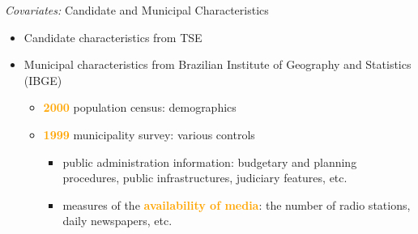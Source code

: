     \begin{frame}{\textit{Covariates:} Candidate and Municipal Characteristics}
    \begin{itemize}
        \item<+-> Candidate characteristics from TSE
        \item<+-> Municipal characteristics from Brazilian Institute of Geography and Statistics (IBGE) 
        \begin{itemize}
            \item<+-> \textbf<6>{\textcolor<6>{orange}{2000}} population census: demographics
            \item<+-> \textbf<6>{\textcolor<6>{orange}{1999}} municipality survey: various controls
            \begin{itemize}
                \item public administration information: budgetary and planning procedures, public infrastructures, judiciary features, etc.
                \item measures of the \textbf<5->{\textcolor<5->{orange}{availability of media}}: the number of radio stations, daily newspapers, etc. 
            \end{itemize}
        \end{itemize}
        
    \end{itemize}
    
        
    \end{frame}